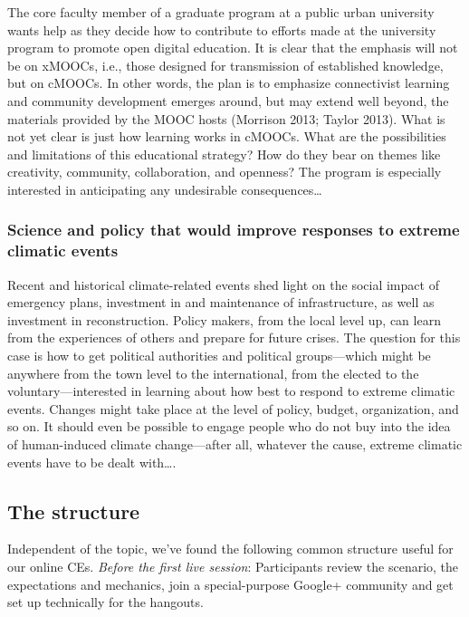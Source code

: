The core faculty member of a graduate program at a public urban
university wants help as they decide how to contribute to efforts made
at the university program to promote open digital education. It is clear
that the emphasis will not be on xMOOCs, i.e., those designed for
transmission of established knowledge, but on cMOOCs. In other words,
the plan is to emphasize connectivist learning and community development
emerges around, but may extend well beyond, the materials provided by
the MOOC hosts (Morrison 2013; Taylor 2013). What is not yet clear is
just how learning works in cMOOCs. What are the possibilities and
limitations of this educational strategy? How do they bear on themes
like creativity, community, collaboration, and openness? The program is
especially interested in anticipating any undesirable
consequences\ldots{}

\subsubsection{Science and policy that would improve responses to
extreme climatic
events}\label{science-and-policy-that-would-improve-responses-to-extreme-climatic-events}

Recent and historical climate-related events shed light on the social
impact of emergency plans, investment in and maintenance of
infrastructure, as well as investment in reconstruction. Policy makers,
from the local level up, can learn from the experiences of others and
prepare for future crises. The question for this case is how to get
political authorities and political groups---which might be anywhere
from the town level to the international, from the elected to the
voluntary---interested in learning about how best to respond to extreme
climatic events. Changes might take place at the level of policy,
budget, organization, and so on. It should even be possible to engage
people who do not buy into the idea of human-induced climate
change---after all, whatever the cause, extreme climatic events have to
be dealt with\ldots{}.

\subsection{The structure}\label{the-structure}

Independent of the topic, we've found the following common structure
useful for our online CEs. \emph{Before the first live session}:
Participants review the scenario, the expectations and mechanics, join a
special-purpose Google+ community and get set up technically for the
hangouts.

